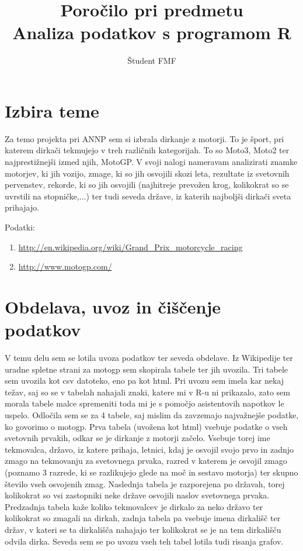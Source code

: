\documentclass[11pt,a4paper]{article}
\begin{document}
\title{Poročilo pri predmetu \\
Analiza podatkov s programom R}
\author{Študent FMF}
\maketitle

\section{Izbira teme}

Za temo projekta pri ANNP sem si izbrala dirkanje z motorji. To je šport, pri katerem dirkači tekmujejo v treh različnih kategorijah. To so Moto3, Moto2 ter najprestižnejši izmed njih, MotoGP. V svoji nalogi nameravam analizirati znamke motorjev, ki jih vozijo, zmage, ki so jih osvojili skozi leta, rezultate iz svetovnih pervenstev, rekorde, ki so jih osvojili (najhitreje prevožen krog, kolikokrat so se uvrstili na stopničke,...) ter tudi seveda države, iz katerih najboljši dirkači sveta prihajajo. 

Podatki: 
\begin{enumerate}
\item \url{http://en.wikipedia.org/wiki/Grand_Prix_motorcycle_racing}
\item \url{http://www.motogp.com/}
\end{enumerate}

\section{Obdelava, uvoz in čiščenje podatkov}

V temu delu sem se lotila uvoza podatkov ter seveda obdelave. Iz Wikipedije ter uradne spletne strani za motogp sem skopirala tabele ter jih uvozila. Tri tabele sem uvozila kot csv datoteko, eno pa kot html. Pri uvozu sem imela kar nekaj težav, saj so se v tabelah nahajali znaki, katere mi v R-u ni prikazalo, zato sem morala tabele malce spremeniti toda mi je s pomočjo asistentovih napotkov le uspelo. Odločila sem se za 4 tabele, saj mislim da zavzemajo najvažnejše podatke, ko govorimo o motogp. Prva tabela (uvožena kot html) vsebuje podatke o vseh svetovnih prvakih, odkar se je dirkanje z motorji začelo. Vsebuje torej ime tekmovalca, državo, iz katere prihaja, letnici, kdaj je osvojil svojo prvo in zadnjo zmago na tekmovanju za svetovnega prvaka, razred v katerem je osvojil zmago (poznamo 3 razrede, ki se razlikujejo glede na moč in sestavo motorja) ter skupno število vseh osvojenih zmag. Naslednja tabela je razporejena po državah, torej kolikokrat so vsi zastopniki neke države osvojili naslov svetovnega prvaka. Predzadnja tabela kaže koliko tekmovalcev je dirkalo za neko državo ter kolikokrat so zmagali na dirkah, zadnja tabela pa vsebuje imena dirkališč ter držav, v kateri se ta dirkališča nahajajo ter kolikokrat se je na tem dirkališču odvila dirka. Seveda sem se po uvozu vseh teh tabel lotila tudi risanja grafov. 
\end{document}
